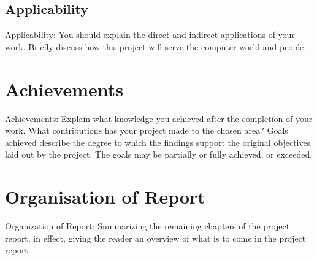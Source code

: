 \subsection{Applicability}
Applicability: You should explain the direct and indirect applications of your work. Briefly discuss how this project will serve the computer world and people.

\section{Achievements}
Achievements: Explain what knowledge you achieved after the completion of your work. What contributions has your project made to the chosen area? Goals achieved describe the degree to which the findings support the original objectives laid out by the project. The goals may be partially or fully achieved, or exceeded.

\section{Organisation of Report}
Organization of Report: Summarizing the remaining chapters of the project report,
in effect, giving the reader an overview of what is to come in the project report.






